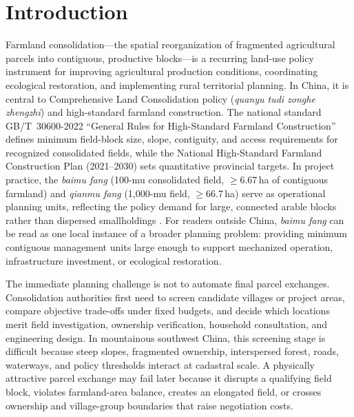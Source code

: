 \documentclass[preprint,12pt]{elsarticle}
\begin{document}

\section{Introduction}
\label{sec:intro}

Farmland consolidation---the spatial reorganization of fragmented agricultural parcels into contiguous, productive blocks---is a recurring land-use policy instrument for improving agricultural production conditions, coordinating ecological restoration, and implementing rural territorial planning. In China, it is central to Comprehensive Land Consolidation policy (\textit{quanyu tudi zonghe zhengzhi}) and high-standard farmland construction. The national standard GB/T~30600-2022 ``General Rules for High-Standard Farmland Construction'' \citep{gbt30600_2022} defines minimum field-block size, slope, contiguity, and access requirements for recognized consolidated fields, while the National High-Standard Farmland Construction Plan (2021--2030) \citep{moa2021plan} sets quantitative provincial targets. In project practice, the \textit{baimu fang} (100-mu consolidated field, $\geq$6.67\,ha of contiguous farmland) and \textit{qianmu fang} (1{,}000-mu field, $\geq$66.7\,ha) serve as operational planning units, reflecting the policy demand for large, connected arable blocks rather than dispersed smallholdings \citep{long2018land, liu2014land}. For readers outside China, \textit{baimu fang} can be read as one local instance of a broader planning problem: providing minimum contiguous management units large enough to support mechanized operation, infrastructure investment, or ecological restoration.

The immediate planning challenge is not to automate final parcel exchanges. Consolidation authorities first need to screen candidate villages or project areas, compare objective trade-offs under fixed budgets, and decide which locations merit field investigation, ownership verification, household consultation, and engineering design. In mountainous southwest China, this screening stage is difficult because steep slopes, fragmented ownership, interspersed forest, roads, waterways, and policy thresholds interact at cadastral scale. A physically attractive parcel exchange may fail later because it disrupts a qualifying field block, violates farmland-area balance, creates an elongated field, or crosses ownership and village-group boundaries that raise negotiation costs.
\end{document}
